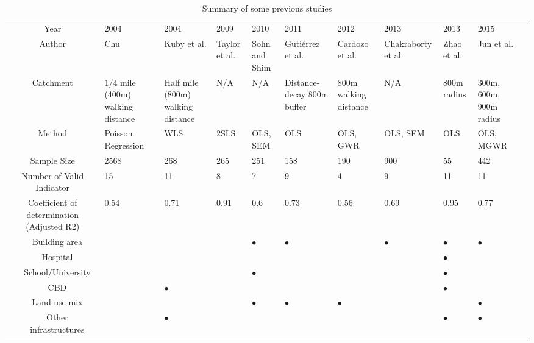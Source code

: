 \documentclass[utf8]{article}
\begin{document}
\begin{table}
	\scriptsize %
	\centering
	\caption{Summary of some previous studies}
	\label{tab:Review}
	\begin{tabular}{|p{8em}<{\centering}|c|p{5em}<{\centering}|p{5em}<{\centering}|p{5em}<{\centering}|p{5em}<{\centering}|p{5em}<{\centering}|p{5em}<{\centering}|p{5em}<{\centering}|p{5em}<{\centering}|p{5em}<{\centering}|p{5em}<{\centering}|}
		\toprule
		\multicolumn{2}{|c|}{Year} & 2004 & 2004 & 2009  & 2010 & 2011 & 2012 & 2013 & 2013 & 2015  \\
		
		\cmidrule{1-11}
		\multicolumn{2}{|c|}{Author} & Chu & Kuby et al. & Taylor et al. & Sohn and Shim & Gutiérrez et al. & Cardozo et al. & Chakraborty et al. & Zhao et al. & Jun et al.  \\
		
		\cmidrule{1-11}
		\multicolumn{2}{|c|}{Catchment} & $1/4$ mile (400m) walking distance & Half mile (800m) walking distance & N/A & N/A & Distance-decay 800m buffer & 800m walking distance & N/A & 800m radius & 300m, 600m, 900m radius  \\
		
		\cmidrule{1-11}
		\multicolumn{2}{|c|}{Method} & Poisson Regression & WLS & 2SLS & OLS, SEM & OLS & OLS, GWR & OLS, SEM & OLS & OLS, MGWR  \\
		
		\cmidrule{1-11}
		\multicolumn{2}{|c|}{Sample Size} & 2568 & 268 & 265 & 251 & 158 & 190 & 900 & 55 & 442  \\
		
		\cmidrule{1-11}
		\multicolumn{2}{|c|}{Number of Valid Indicator} & 15 & 11 & 8 & 7 & 9 & 4 & 9 & 11 & 11  \\
		
		\cmidrule{1-11}
		\multicolumn{2}{|c|}{Coefficient of determination (Adjusted R2)} & 0.54 & 0.71 & 0.91 & 0.6 & 0.73 & 0.56 & 0.69 & 0.95 & 0.77  \\
		\midrule
		
		\multirow{6}[10]{8em}{\centering{Land use factors}} & Building area & & & & $\bullet$ & $\bullet$ & & $\bullet$ & $\bullet$ & $\bullet$  \\
		\cmidrule{2-11}
		& Hospital & & & & & & & & $\bullet$ &  \\
		\cmidrule{2-11}
		& School/University & & & & $\bullet$ & & & & $\bullet$ &  \\
		\cmidrule{2-11}
		& CBD & & $\bullet$ & & & & & & $\bullet$ &  \\
		\cmidrule{2-11}
		& Land use mix & & & & $\bullet$ & $\bullet$ & $\bullet$ & & & $\bullet$ \\
		\cmidrule{2-11}
		& Other infrastructures & & $\bullet$ & & & & & & $\bullet$ & $\bullet$ \\
		

\end{tabular}
\end{table}
\end{document}
